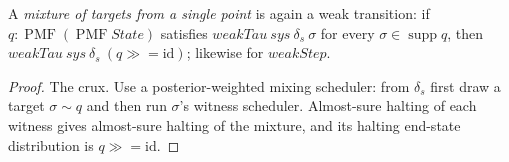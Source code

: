 \begin{lemma}
  \label{lem:bind}
  \leanok
  A \emph{mixture of targets from a single point} is again a weak transition: if
  $q : \operatorname{PMF}(\operatorname{PMF} State)$ satisfies
  $weakTau\ sys\ \delta_s\ \sigma$ for every $\sigma \in \operatorname{supp} q$,
  then $weakTau\ sys\ \delta_s\ (q \mathbin{\gg\!=} \mathrm{id})$; likewise for
  $weakStep$.
\end{lemma}

\begin{proof}\leanok
  The crux. Use a posterior-weighted mixing scheduler: from $\delta_s$ first draw a
  target $\sigma \sim q$ and then run $\sigma$'s witness scheduler. Almost-sure
  halting of each witness gives almost-sure halting of the mixture, and its halting
  end-state distribution is $q \mathbin{\gg\!=} \mathrm{id}$.
\end{proof}
